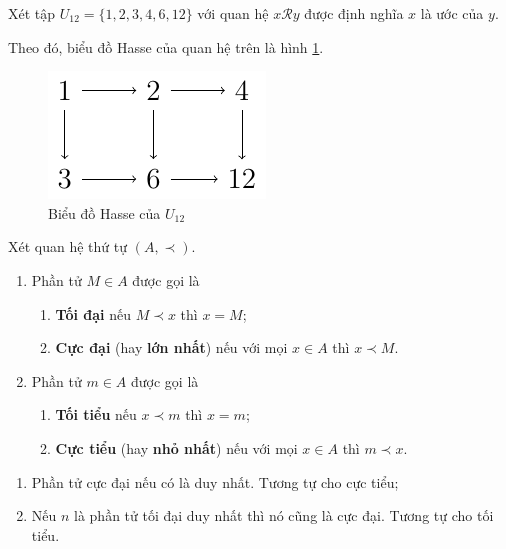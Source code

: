 \documentclass{mynotes}
\begin{document}
\begin{example}
    Xét tập $U_{12} = \{ 1, 2, 3, 4, 6, 12 \}$ với quan hệ $x \mathcal{R} y$ được định nghĩa $x$ là ước của $y$.

    Theo đó, biểu đồ Hasse của quan hệ trên là hình \ref{hasse:1}.
    \begin{figure}[ht]
        \centering
        \includegraphics{figures/hasse/hasse1.pdf}
        \caption{Biểu đồ Hasse của $U_{12}$}
        \label{hasse:1}
    \end{figure}
\end{example}

\begin{definition}
    Xét quan hệ thứ tự $(A, \prec)$.
    \begin{enumerate}
        \item Phần tử $M \in A$ được gọi là
        \begin{enumerate}
            \item \textbf{Tối đại} nếu $M \prec x$ thì $x = M$;
            \item \textbf{Cực đại} (hay \textbf{lớn nhất}) nếu với mọi $x \in A$ thì $x \prec M$.
        \end{enumerate}
        \item Phần tử $m \in A$ được gọi là
        \begin{enumerate}
            \item \textbf{Tối tiểu} nếu $x \prec m$ thì $x = m$;
            \item \textbf{Cực tiểu} (hay \textbf{nhỏ nhất}) nếu với mọi $x \in A$ thì $m \prec x$.
        \end{enumerate}
    \end{enumerate}
\end{definition}

\begin{remark}
    \begin{enumerate}
        \item Phần tử cực đại nếu có là duy nhất. Tương tự cho cực tiểu;
        \item Nếu $n$ là phần tử tối đại duy nhất thì nó cũng là cực đại. Tương tự cho tối tiểu.
    \end{enumerate}
\end{remark}
\end{document}
